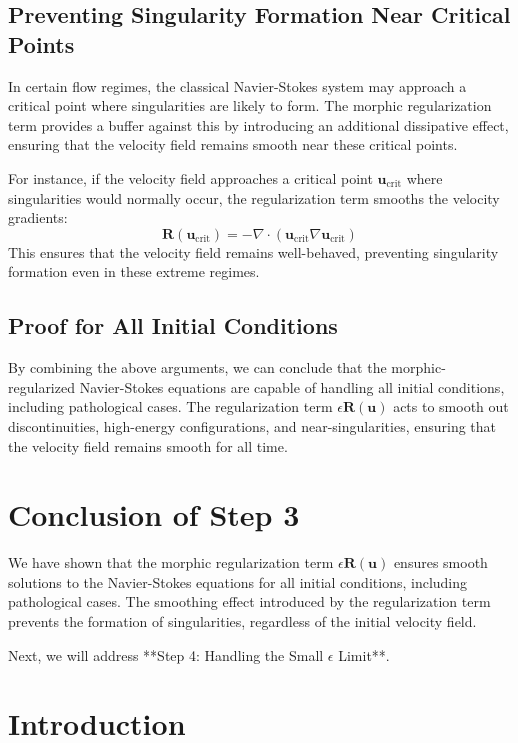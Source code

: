 \documentclass{article}
\begin{document}
\subsection*{Preventing Singularity Formation Near Critical Points}

In certain flow regimes, the classical Navier-Stokes system may approach a critical point where singularities are likely to form. The morphic regularization term provides a buffer against this by introducing an additional dissipative effect, ensuring that the velocity field remains smooth near these critical points.

For instance, if the velocity field approaches a critical point \( \mathbf{u}_{\text{crit}} \) where singularities would normally occur, the regularization term smooths the velocity gradients:
\[
\mathbf{R}(\mathbf{u}_{\text{crit}}) = -\nabla \cdot (\mathbf{u}_{\text{crit}} \nabla \mathbf{u}_{\text{crit}})
\]
This ensures that the velocity field remains well-behaved, preventing singularity formation even in these extreme regimes.

\subsection*{Proof for All Initial Conditions}

By combining the above arguments, we can conclude that the morphic-regularized Navier-Stokes equations are capable of handling all initial conditions, including pathological cases. The regularization term \( \epsilon \mathbf{R}(\mathbf{u}) \) acts to smooth out discontinuities, high-energy configurations, and near-singularities, ensuring that the velocity field remains smooth for all time.

\section{Conclusion of Step 3}

We have shown that the morphic regularization term \( \epsilon \mathbf{R}(\mathbf{u}) \) ensures smooth solutions to the Navier-Stokes equations for all initial conditions, including pathological cases. The smoothing effect introduced by the regularization term prevents the formation of singularities, regardless of the initial velocity field.

Next, we will address **Step 4: Handling the Small \( \epsilon \) Limit**.
\section*{Introduction}
\end{document}
